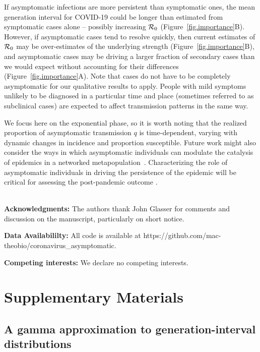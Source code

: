 \documentclass[12pt]{article}
\begin{document}
If asymptomatic infections are more persistent than symptomatic ones, the mean generation interval for COVID-19 could be longer than estimated from symptomatic cases alone -- possibly increasing ${\cal{R}}_0$ (Figure~\ref{fig.importance}B).
However, if asymptomatic cases tend to resolve quickly, then current estimates of ${\cal{R}}_0$ may be over-estimates of the underlying strength (Figure~\ref{fig.importance}B), and asymptomatic cases may be driving a larger fraction of secondary cases than we would expect without accounting for their differences (Figure~\ref{fig.importance}A).
Note that cases do not have to be completely asymptomatic for our qualitative results to apply.
People with mild symptoms unlikely to be diagnosed in a particular time and place (sometimes referred to as subclinical cases) are expected to affect transmission patterns in the same way.

We focus here on the exponential phase, so it is worth noting that the realized proportion of asymptomatic transmission $q$ is time-dependent, varying with dynamic changes in incidence and proportion susceptible. 
Future work might also consider the ways in which asymptomatic individuals can modulate the catalysis of epidemics in a networked metapopulation~\cite{watts_pnas2005, chinazzi2020effect, du2020risk}.
Characterizing the role of asymptomatic individuals in driving the persistence of the epidemic will be critical for assessing the post-pandemic outcome \cite{lipsitch_preprint}.

\mbox{}\\
\noindent
\textbf{Acknowledgments:} The authors thank John Glasser for comments
and discussion on the manuscript, particularly on short notice. 

\noindent
\textbf{Data Availabililty:} All code is available at https://github.com/mac-theobio/coronavirus\_asymptomatic.

\noindent
\textbf{Competing interests:} We declare no competing interests.

\pagebreak

\section*{Supplementary Materials}
\renewcommand\thefigure{S\arabic{figure}}
\renewcommand\theequation{S\arabic{equation}}
\setcounter{figure}{0}
\setcounter{equation}{0}

\subsection*{A gamma approximation to generation-interval distributions}
\end{document}
